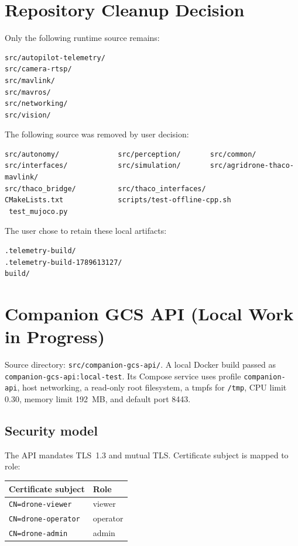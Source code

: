 \documentclass[11pt,a4paper]{article}
\newcommand{\pathtext}[1]{\texttt{#1}}
\begin{document}
\section{Repository Cleanup Decision}

Only the following runtime source remains:

\begin{lstlisting}
src/autopilot-telemetry/
src/camera-rtsp/
src/mavlink/
src/mavros/
src/networking/
src/vision/
\end{lstlisting}

The following source was removed by user decision:

\begin{lstlisting}
src/autonomy/              src/perception/       src/common/
src/interfaces/            src/simulation/       src/agridrone-thaco-mavlink/
src/thaco_bridge/          src/thaco_interfaces/
CMakeLists.txt             scripts/test-offline-cpp.sh
 test_mujoco.py
\end{lstlisting}

The user chose to retain these local artifacts:

\begin{lstlisting}
.telemetry-build/
.telemetry-build-1789613127/
build/
\end{lstlisting}

\section{Companion GCS API (Local Work in Progress)}

Source directory: \pathtext{src/companion-gcs-api/}. A local Docker build passed
as \pathtext{companion-gcs-api:local-test}. Its Compose service uses profile
\pathtext{companion-api}, host networking, a read-only root filesystem, a tmpfs
for \pathtext{/tmp}, CPU limit 0.30, memory limit 192~MB, and default port 8443.

\subsection{Security model}

The API mandates TLS~1.3 and mutual TLS. Certificate subject is mapped to role:

\begin{center}
\begin{tabular}{ll}
\toprule
Certificate subject & Role \\
\midrule
\pathtext{CN=drone-viewer} & viewer \\
\pathtext{CN=drone-operator} & operator \\
\pathtext{CN=drone-admin} & admin \\
\bottomrule
\end{tabular}
\end{center}
\end{document}
